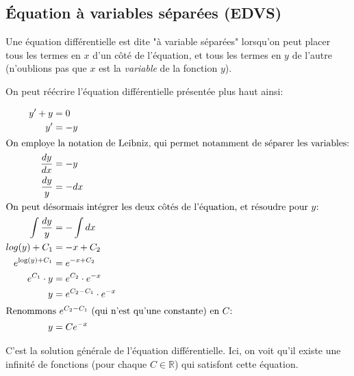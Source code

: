\documentclass{report}
\begin{document}
\subsection{Équation à variables séparées (EDVS)}
Une équation différentielle est dite "à variable séparées" lorsqu'on peut placer tous les termes en $x$ d'un côté de l'équation, et tous les termes en $y$ de l'autre (n'oublions pas que $x$ est la \emph{variable} de la fonction $y$).
\begin{exmp}
On peut réécrire l'équation différentielle présentée plus haut ainsi:

\begin{align*}
	y' + y &= 0 \\
	y' &= -y \\
\intertext{On employe la notation de Leibniz, qui permet notamment de séparer les variables:}
	\dfrac{dy}{dx} &= -y \\
	\dfrac{dy}{y} &= -dx \\
\intertext{On peut désormais intégrer les deux côtés de l'équation, et résoudre pour $y$:}
	\int \dfrac{dy}{y} &= -\int dx \\
	log(y) + C_1 &= -x + C_2 \\
	e^{\log(y) + C_1} &= e^{-x + C_2} \\
	e^{C_1} \cdot y &= e^{C_2} \cdot e^{-x} \\
	y &= e^{C_2 - C_1} \cdot e^{-x} \\
\intertext{Renommons $e^{C_2 - C_1}$ (qui n'est qu'une constante) en $C$:}
	y &= Ce^{-x}
\end{align*}

C'est la solution générale de l'équation différentielle. Ici, on voit qu'il existe une infinité de fonctions (pour chaque $C \in \mathbb{R}$) qui satisfont cette équation.

\end{exmp}
\end{document}
